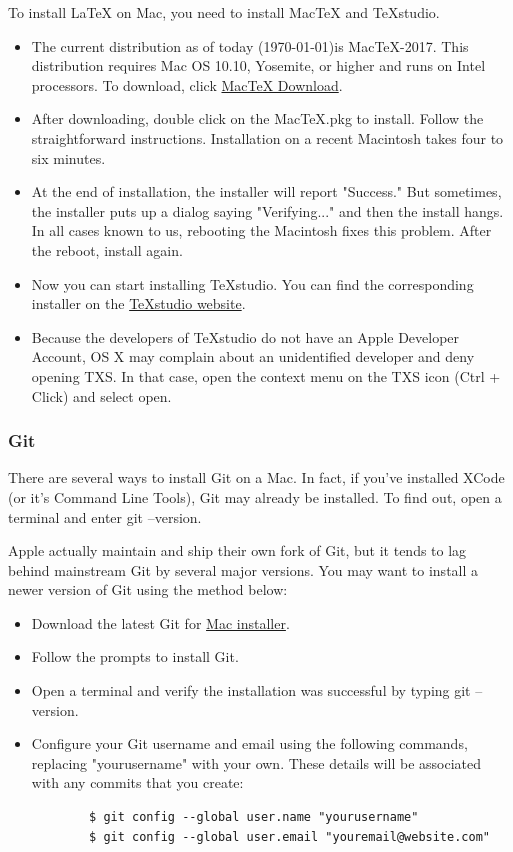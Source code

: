 \documentclass[10pt]{article} %
\begin{document}
      To install LaTeX on Mac, you need to install MacTeX and TeXstudio.
      \begin{itemize}
        \item The current distribution as of today (\today)is MacTeX-2017.
        This distribution requires Mac OS 10.10, Yosemite, or higher and runs on Intel processors.
        To download, click \href{http://www.tug.org/mactex/mactex-download.html}{MacTeX Download}.
        \item After downloading, double click on the MacTeX.pkg to install.
        Follow the straightforward instructions.
        Installation on a recent Macintosh takes four to six minutes.
        \item At the end of installation, the installer will report "Success." But sometimes, the installer puts up a dialog saying "Verifying..." and then the install hangs.
        In all cases known to us, rebooting the Macintosh fixes this problem.
        After the reboot, install again.
        \item Now you can start installing TeXstudio.
        You can find the corresponding installer on the \href{https://www.texstudio.org/}{TeXstudio website}.
        \item Because the developers of TeXstudio do not have an Apple Developer Account, OS X may complain about an unidentified developer and deny opening TXS.
        In that case, open the context menu on the TXS icon (Ctrl + Click) and select open.
      \end{itemize}

    \subsubsection{Git}

      There are several ways to install Git on a Mac.
      In fact, if you've installed XCode (or it's Command Line Tools), Git may already be installed.
      To find out, open a terminal and enter git --version.

      Apple actually maintain and ship their own fork of Git, but it tends to lag behind mainstream Git by several major versions.
      You may want to install a newer version of Git using the method below:
      \begin{itemize}
        \item Download the latest Git for \href{https://git-scm.com/download/mac}{Mac installer}.
        \item Follow the prompts to install Git.
        \item Open a terminal and verify the installation was successful by typing git --version.
        \item Configure your Git username and email using the following commands, replacing "yourusername" with your own.
        These details will be associated with any commits that you create:
        \begin{lstlisting}
        $ git config --global user.name "yourusername"
        $ git config --global user.email "youremail@website.com"
        \end{lstlisting}
      \end{itemize}
\end{document}
